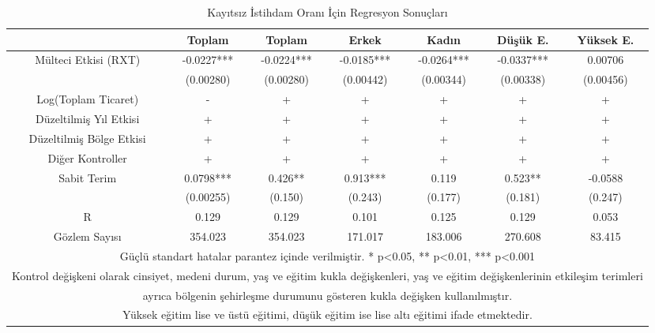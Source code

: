 \documentclass{article}
\begin{document}
\begin{justify}
        \FloatBarrier
        \begin{table}[h]
            \centering
            \caption{Kayıtsız İstihdam Oranı İçin Regresyon Sonuçları}
            \begin{tabular}{|ccccccc|}
                \hline
                     & Toplam & Toplam & Erkek & Kadın & Düşük E. & Yüksek E. \\ \hline
                    Mülteci Etkisi (RXT) & -0.0227*** & -0.0224*** & -0.0185*** & -0.0264*** & -0.0337*** & 0.00706 \\ 
                     & (0.00280) & (0.00280) & (0.00442) & (0.00344) & (0.00338) & (0.00456) \\ 
                    Log(Toplam Ticaret) & - & + & + & + & + & + \\ 
                    Düzeltilmiş Yıl Etkisi & + & + & + & + & + & + \\ 
                    Düzeltilmiş Bölge Etkisi & + & + & + & + & + & + \\ 
                    Diğer Kontroller & + & + & + & + & + & + \\
                    Sabit Terim & 0.0798*** & 0.426** & 0.913*** & 0.119 & 0.523** & -0.0588 \\ 
                     & (0.00255) & (0.150) & (0.243) & (0.177) & (0.181) & (0.247) \\ 
                    R & 0.129 & 0.129 & 0.101 & 0.125 & 0.129 & 0.053 \\ 
                    Gözlem Sayısı & 354.023 & 354.023 & 171.017 & 183.006 & 270.608 & 83.415 \\ 
                    \multicolumn{7}{|c|}{\scriptsize Güçlü standart hatalar parantez içinde verilmiştir.   * p<0.05, ** p<0.01, *** p<0.001}\\ \hline
                    \multicolumn{7}{|c|}{\scriptsize Kontrol değişkeni olarak cinsiyet, medeni durum, yaş ve eğitim kukla değişkenleri, yaş ve eğitim değişkenlerinin etkileşim terimleri} \\ 
                    \multicolumn{7}{|c|}{\scriptsize ayrıca bölgenin şehirleşme durumunu gösteren kukla değişken kullanılmıştır.} \\ \hline
                    \multicolumn{7}{|c|}{\scriptsize Yüksek eğitim lise ve üstü eğitimi, düşük eğitim ise lise altı eğitimi ifade etmektedir.} \\ \hline

                \end{tabular}
        \end{table}
        \FloatBarrier


\end{justify}
\end{document}
